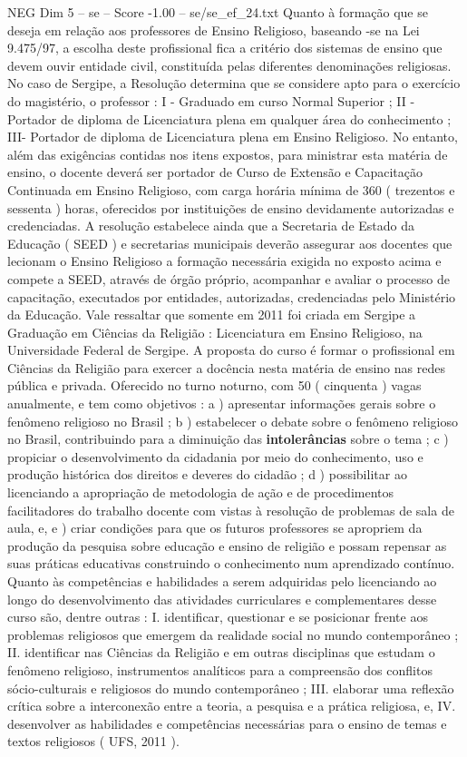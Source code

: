 \begin{textsample}{NEG Dim 5 – se – Score -1.00 – se/se\_ef\_24.txt}
Quanto à formação que se deseja em relação aos professores de Ensino Religioso, baseando -se na Lei 9.475/97, a escolha deste profissional fica a critério dos sistemas de ensino que devem ouvir entidade civil, constituída pelas diferentes denominações religiosas.
No caso de Sergipe, a Resolução determina que se considere apto para o exercício do magistério, o professor : I - Graduado em curso Normal Superior ; II - Portador de diploma de Licenciatura plena em qualquer área do conhecimento ; III- Portador de diploma de Licenciatura plena em Ensino Religioso.
No entanto, além das exigências contidas nos itens expostos, para ministrar esta matéria de ensino, o docente deverá ser portador de Curso de Extensão e Capacitação Continuada em Ensino Religioso, com carga horária mínima de 360 ( trezentos e sessenta ) horas, oferecidos por instituições de ensino devidamente autorizadas e credenciadas.
A resolução estabelece ainda que a Secretaria de Estado da Educação ( SEED ) e secretarias municipais deverão assegurar aos docentes que lecionam o Ensino Religioso a formação necessária exigida no exposto acima e compete a SEED, através de órgão próprio, acompanhar e avaliar o processo de capacitação, executados por entidades, autorizadas, credenciadas pelo Ministério da Educação.
Vale ressaltar que somente em 2011 foi criada em Sergipe a Graduação em Ciências da Religião : Licenciatura em Ensino Religioso, na Universidade Federal de Sergipe.
A proposta do curso é formar o profissional em Ciências da Religião para exercer a docência nesta matéria de ensino nas redes pública e privada.
Oferecido no turno noturno, com 50 ( cinquenta ) vagas anualmente, e tem como objetivos : a ) apresentar informações gerais sobre o fenômeno religioso no Brasil ; b ) estabelecer o debate sobre o fenômeno religioso no Brasil, contribuindo para a diminuição das \textbf{intolerâncias} sobre o tema ; c ) propiciar o desenvolvimento da cidadania por meio do conhecimento, uso e produção histórica dos direitos e deveres do cidadão ; d ) possibilitar ao licenciando a apropriação de metodologia de ação e de procedimentos facilitadores do trabalho docente com vistas à resolução de problemas de sala de aula, e, e ) criar condições para que os futuros professores se apropriem da produção da pesquisa sobre educação e ensino de religião e possam repensar as suas práticas educativas construindo o conhecimento num aprendizado contínuo.
Quanto às competências e habilidades a serem adquiridas pelo licenciando ao longo do desenvolvimento das atividades curriculares e complementares desse curso são, dentre outras : I. identificar, questionar e se posicionar frente aos problemas religiosos que emergem da realidade social no mundo contemporâneo ; II. identificar nas Ciências da Religião e em outras disciplinas que estudam o fenômeno religioso, instrumentos analíticos para a compreensão dos conflitos sócio-culturais e religiosos do mundo contemporâneo ; III. elaborar uma reflexão crítica sobre a interconexão entre a teoria, a pesquisa e a prática religiosa, e, IV. desenvolver as habilidades e competências necessárias para o ensino de temas e textos religiosos ( UFS, 2011 ).

\end{textsample}
